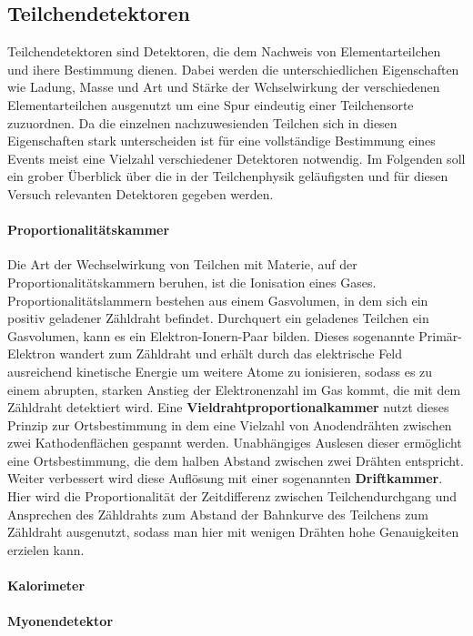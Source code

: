 \subsection{Teilchendetektoren}
Teilchendetektoren sind Detektoren, die dem Nachweis von Elementarteilchen und ihere Bestimmung dienen. Dabei werden die unterschiedlichen Eigenschaften wie Ladung, Masse und Art und Stärke der Wchselwirkung der verschiedenen Elementarteilchen ausgenutzt um eine Spur eindeutig einer Teilchensorte zuzuordnen. Da die einzelnen nachzuwesienden Teilchen sich in diesen Eigenschaften stark unterscheiden ist für eine vollständige Bestimmung eines Events meist eine Vielzahl verschiedener Detektoren notwendig. Im Folgenden soll ein grober Überblick über die in der Teilchenphysik geläufigsten und für diesen Versuch relevanten Detektoren gegeben werden. \cite{povh}

\paragraph{Proportionalitätskammer}
Die Art der Wechselwirkung von Teilchen mit Materie, auf der Proportionalitätskammern beruhen, ist die Ionisation eines Gases. Proportionalitätslammern bestehen aus einem Gasvolumen, in dem sich ein positiv geladener Zähldraht befindet. Durchquert ein geladenes Teilchen ein Gasvolumen, kann es ein Elektron-Ionern-Paar bilden. Dieses sogenannte Primär-Elektron wandert zum Zähldraht und erhält durch das elektrische Feld ausreichend kinetische Energie um weitere Atome zu ionisieren, sodass es zu einem abrupten, starken Anstieg der Elektronenzahl im Gas kommt, die mit dem Zähldraht detektiert wird. 
Eine \textbf{Vieldrahtproportionalkammer} nutzt dieses Prinzip zur Ortsbestimmung in dem eine Vielzahl von Anodendrähten zwischen zwei Kathodenflächen gespannt werden. Unabhängiges Auslesen dieser ermöglicht eine Ortsbestimmung, die dem halben Abstand zwischen zwei Drähten entspricht. Weiter verbessert wird diese Auflösung mit einer sogenannten \textbf{Driftkammer}. Hier wird die Proportionalität der Zeitdifferenz zwischen Teilchendurchgang und Ansprechen des Zähldrahts zum Abstand der Bahnkurve des Teilchens zum Zähldraht ausgenutzt, sodass man hier mit wenigen Drähten hohe Genauigkeiten erzielen kann. \cite{anleitungalt}

\paragraph{Kalorimeter}
\paragraph{Myonendetektor}

